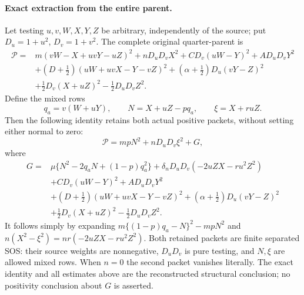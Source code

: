 \paragraph{Exact extraction from the entire parent.}
Let testing $u,v,W,X,Y,Z$ be arbitrary, independently of the source;
put $D_u=1+u^2$, $D_v=1+v^2$.  The complete original quarter-parent is
\begin{align*}
 \mathcal P={}&m(vW-X+uvY-uZ)^2+nD_uD_vX^2
     +CD_v(uW-Y)^2+AD_uD_vY^2\\
 &+(D+\tfrac12)(uW+uvX-Y-vZ)^2
     +(\alpha+\tfrac12)D_u(vY-Z)^2\\
 &+\tfrac12D_v(X+uZ)^2-\tfrac12D_uD_vZ^2.
\end{align*}
Define the mixed rows
\[
 q_a=v(W+uY),\qquad N=X+uZ-pq_a,\qquad \xi=X+ruZ.
\]
Then the following identity retains both actual positive packets,
without setting either normal to zero:
\[
 \mathcal P=mpN^2+nD_uD_v\xi^2+G,                       \tag{RER8}
\]
where
\begin{align*}
 G={}&\mu\{N^2-2q_aN+(1-p)q_a^2\}
        +\delta_nD_uD_v(-2uZX-ru^2Z^2)\\
 &+CD_v(uW-Y)^2+AD_uD_vY^2\\
 &+(D+\tfrac12)(uW+uvX-Y-vZ)^2
        +(\alpha+\tfrac12)D_u(vY-Z)^2\\
 &+\tfrac12D_v(X+uZ)^2-\tfrac12D_uD_vZ^2.
\end{align*}
It follows simply by expanding
$m\{(1-p)q_a-N\}^2-mpN^2$ and
$n(X^2-\xi^2)=nr(-2uZX-ru^2Z^2)$.
Both retained packets are finite separated SOS: their source weights
are nonnegative, $D_uD_v$ is pure testing, and $N,\xi$ are allowed
mixed rows.  When $n=0$ the second packet vanishes literally.
The exact identity and all estimates above are the reconstructed
structural conclusion; no positivity conclusion about $G$ is asserted.
